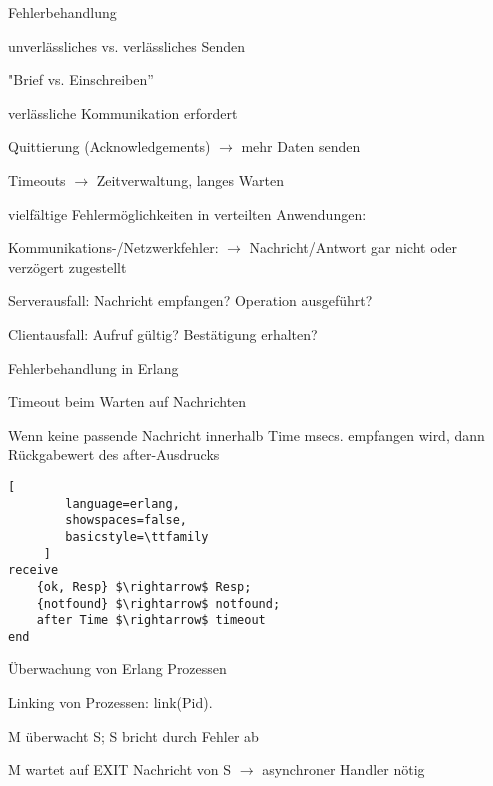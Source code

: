 \documentclass[10pt]{article}
\begin{document}
\begin{itemize*}
Fehlerbehandlung
\begin{itemize*}
  \item unverlässliches vs. verlässliches Senden
  \begin{itemize*}
    \item "Brief vs. Einschreiben”
  \end{itemize*}
  \item verlässliche Kommunikation erfordert
  \begin{itemize*}
    \item Quittierung (Acknowledgements) $\rightarrow$ mehr Daten senden
    \item Timeouts $\rightarrow$ Zeitverwaltung, langes Warten
  \end{itemize*}
  \item vielfältige Fehlermöglichkeiten in verteilten Anwendungen:
  \begin{itemize*}
    \item Kommunikations-/Netzwerkfehler: $\rightarrow$ Nachricht/Antwort gar nicht oder verzögert zugestellt
    \item Serverausfall: Nachricht empfangen? Operation ausgeführt?
    \item Clientausfall: Aufruf gültig? Bestätigung erhalten?
  \end{itemize*}
\end{itemize*}

Fehlerbehandlung in Erlang
\begin{itemize*}
  \item Timeout beim Warten auf Nachrichten
  \item Wenn keine passende Nachricht innerhalb Time msecs. empfangen wird, dann Rückgabewert des after-Ausdrucks
\end{itemize*}
\begin{lstlisting}[
        language=erlang,
        showspaces=false,
        basicstyle=\ttfamily
     ]
receive
    {ok, Resp} $\rightarrow$ Resp;
    {notfound} $\rightarrow$ notfound;
    after Time $\rightarrow$ timeout
end
\end{lstlisting}

Überwachung von Erlang Prozessen
\begin{itemize*}
  \item Linking von Prozessen: link(Pid).
  \item M überwacht S; S bricht durch Fehler ab
  \item M wartet auf EXIT Nachricht von S $\rightarrow$ asynchroner Handler nötig
\end{itemize*}


\end{itemize*}
\end{document}
